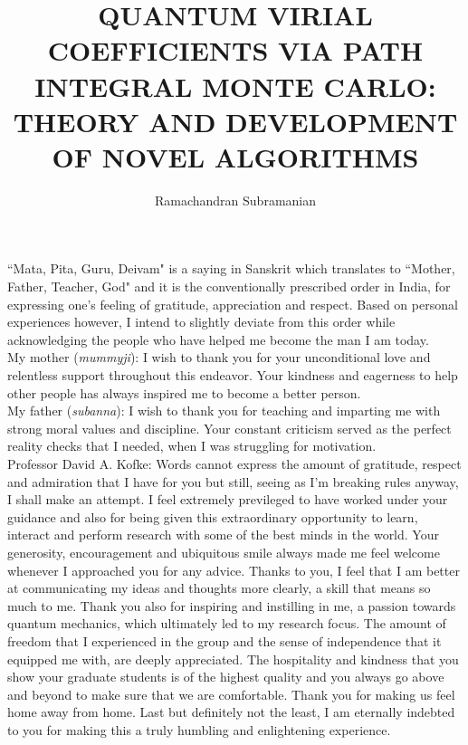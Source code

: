\documentclass[a4paper,11pt,english,twoside]{ubthesis}
\title{QUANTUM VIRIAL COEFFICIENTS VIA PATH INTEGRAL MONTE CARLO: THEORY AND DEVELOPMENT OF NOVEL ALGORITHMS}
\author{Ramachandran Subramanian}
\begin{document}
\begin{titlepage}
\maketitle
\end{titlepage}

\begin{ubfrontmatter}
\makecopyright
\cleardoublepage
\begin{acknowledgements}
    ``Mata, Pita, Guru, Deivam" is a saying in Sanskrit which translates to ``Mother, Father, Teacher, God" and it is the conventionally prescribed order in India, for expressing one's feeling of gratitude, appreciation and respect. Based on personal experiences however, I intend to slightly deviate from this order while acknowledging the people who have helped me become the man I am today.\\

    \noindent My mother (\emph{mummyji}): I wish to thank you for your unconditional love and relentless support throughout this endeavor. Your kindness and eagerness to help other people has always inspired me to become a better person.\\
    
    \noindent My father (\emph{subanna}): I wish to thank you for teaching and imparting me with strong moral values and discipline. Your constant criticism served as the perfect reality checks that I needed, when I was struggling for motivation.\\

    \noindent Professor David A. Kofke: Words cannot express the amount of gratitude, respect and admiration that I have for you but still, seeing as I'm breaking rules anyway, I shall make an attempt. I feel extremely previleged to have worked under your guidance and also for being given this extraordinary opportunity to learn, interact and perform research with some of the best minds in the world. Your generosity, encouragement and ubiquitous smile always made me feel welcome whenever I approached you for any advice. Thanks to you, I feel that I am better at communicating my ideas and thoughts more clearly, a skill that means so much to me. Thank you also for inspiring and instilling in me, a passion towards quantum mechanics, which ultimately led to my research focus. The amount of freedom that I experienced in the group and the sense of independence that it equipped me with, are deeply appreciated. The hospitality and kindness that you show your graduate students is of the highest quality and you always go above and beyond to make sure that we are comfortable. Thank you for making us feel home away from home. Last but definitely not the least, I am eternally indebted to you for making this a truly humbling and enlightening experience.\\


\end{acknowledgements}
\end{ubfrontmatter}
\end{document}
